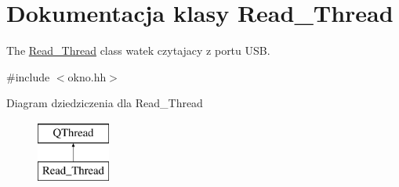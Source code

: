 \hypertarget{class_read___thread}{}\section{Dokumentacja klasy Read\+\_\+\+Thread}
\label{class_read___thread}


The \hyperlink{class_read___thread}{Read\+\_\+\+Thread} class watek czytajacy z portu U\+SB.  




{\ttfamily \#include $<$okno.\+hh$>$}

Diagram dziedziczenia dla Read\+\_\+\+Thread\begin{figure}[H]
\begin{center}
\leavevmode
\includegraphics[height=2.000000cm]{class_read___thread}
\end{center}
\end{figure}
